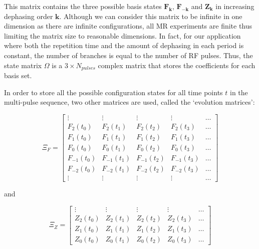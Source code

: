 \hfill

This matrix contains the three possible basis states $\bm{F_k}$, $\bm{F_{-k}}$ and $\bm{Z_k}$ in increasing dephasing order $\bm{k}$.
Although we can consider this matrix to be infinite in one dimension as there are infinite configurations, all MR experiments are finite thus limiting the matrix size to reasonable dimensions.
In fact, for our application where both the repetition time and the amount of dephasing in each period is constant, the number of branches is equal to the number of RF pulses.
Thus, the state matrix $\Omega$ is a $3 \times N_{pulses}$ complex matrix that stores the coefficients for each basis set.

\hfill

In order to store all the possible configuration states for all time points $t$ in the multi-pulse sequence, two other matrices are used, called the `evolution matrices':

\begin{equation}
    \Xi_F = 
    \begin{bmatrix}
    \vdots & \vdots & \vdots & \vdots & \dots \\
    F_2(t_0) & F_2(t_1) & F_2(t_2) & F_2(t_3) & \dots \\
    F_1(t_0) & F_1(t_1) & F_1(t_2) & F_1(t_3) & \dots \\
    F_0(t_0) & F_0(t_1) & F_0(t_2) & F_0(t_3) & \dots \\
    F_{-1}(t_0) & F_{-1}(t_1) & F_{-1}(t_2) & F_{-1}(t_3) & \dots \\
    F_{-2}(t_0) & F_{-2}(t_1) & F_{-2}(t_2) & F_{-2}(t_3) & \dots \\
    \vdots & \vdots & \vdots & \vdots & \dots 
    \end{bmatrix}
\end{equation}

and

\begin{equation}
    \Xi_Z = 
    \begin{bmatrix}
    \vdots & \vdots & \vdots & \vdots & \dots \\
    Z_2(t_0) & Z_2(t_1) & Z_2(t_2) & Z_2(t_3) & \dots \\
    Z_1(t_0) & Z_1(t_1) & Z_1(t_2) & Z_1(t_3) & \dots \\
    Z_0(t_0) & Z_0(t_1) & Z_0(t_2) & Z_0(t_3) & \dots 
    \end{bmatrix}
\end{equation}

\hfill

